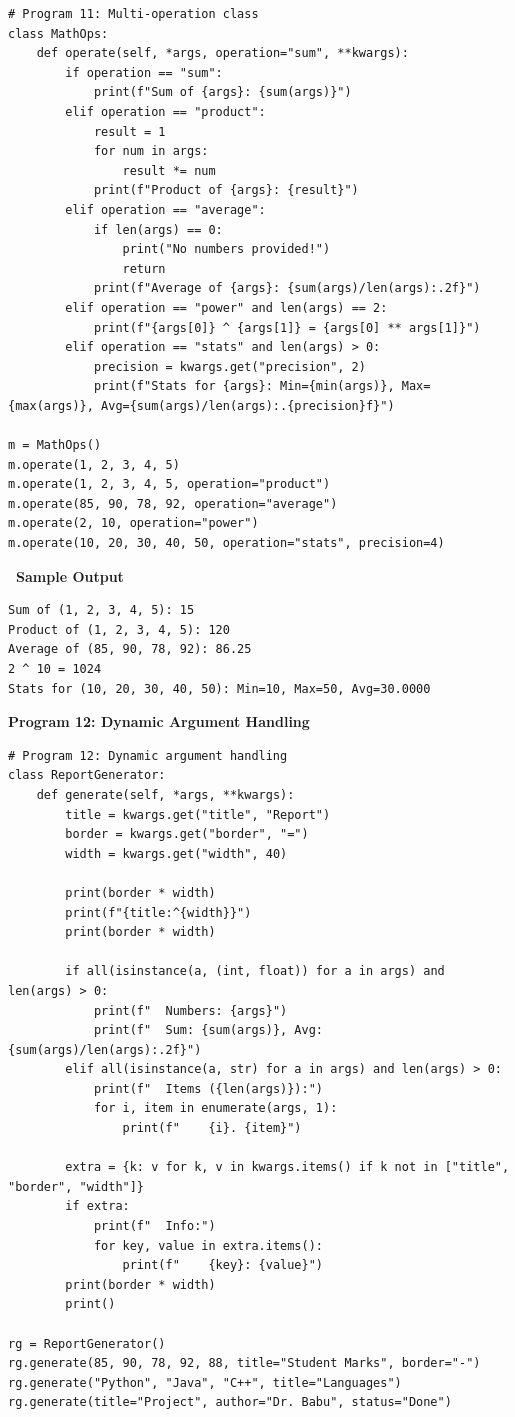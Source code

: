 \documentclass[12pt,a4paper]{article}
\newcommand{\outhead}{\noindent\colorbox{cmrgreen!25}%
  {\textbf{\small\color{cmrdark}~Sample Output~}}\par\vspace{-1pt}}
\begin{document}
\begin{lstlisting}
# Program 11: Multi-operation class
class MathOps:
    def operate(self, *args, operation="sum", **kwargs):
        if operation == "sum":
            print(f"Sum of {args}: {sum(args)}")
        elif operation == "product":
            result = 1
            for num in args:
                result *= num
            print(f"Product of {args}: {result}")
        elif operation == "average":
            if len(args) == 0:
                print("No numbers provided!")
                return
            print(f"Average of {args}: {sum(args)/len(args):.2f}")
        elif operation == "power" and len(args) == 2:
            print(f"{args[0]} ^ {args[1]} = {args[0] ** args[1]}")
        elif operation == "stats" and len(args) > 0:
            precision = kwargs.get("precision", 2)
            print(f"Stats for {args}: Min={min(args)}, Max={max(args)}, Avg={sum(args)/len(args):.{precision}f}")

m = MathOps()
m.operate(1, 2, 3, 4, 5)
m.operate(1, 2, 3, 4, 5, operation="product")
m.operate(85, 90, 78, 92, operation="average")
m.operate(2, 10, operation="power")
m.operate(10, 20, 30, 40, 50, operation="stats", precision=4)
\end{lstlisting}

\outhead
\begin{lstlisting}[style=outputstyle]
Sum of (1, 2, 3, 4, 5): 15
Product of (1, 2, 3, 4, 5): 120
Average of (85, 90, 78, 92): 86.25
2 ^ 10 = 1024
Stats for (10, 20, 30, 40, 50): Min=10, Max=50, Avg=30.0000
\end{lstlisting}

\vspace{0.5cm}

\textbf{Program 12: Dynamic Argument Handling}

\begin{lstlisting}
# Program 12: Dynamic argument handling
class ReportGenerator:
    def generate(self, *args, **kwargs):
        title = kwargs.get("title", "Report")
        border = kwargs.get("border", "=")
        width = kwargs.get("width", 40)

        print(border * width)
        print(f"{title:^{width}}")
        print(border * width)

        if all(isinstance(a, (int, float)) for a in args) and len(args) > 0:
            print(f"  Numbers: {args}")
            print(f"  Sum: {sum(args)}, Avg: {sum(args)/len(args):.2f}")
        elif all(isinstance(a, str) for a in args) and len(args) > 0:
            print(f"  Items ({len(args)}):")
            for i, item in enumerate(args, 1):
                print(f"    {i}. {item}")

        extra = {k: v for k, v in kwargs.items() if k not in ["title", "border", "width"]}
        if extra:
            print(f"  Info:")
            for key, value in extra.items():
                print(f"    {key}: {value}")
        print(border * width)
        print()

rg = ReportGenerator()
rg.generate(85, 90, 78, 92, 88, title="Student Marks", border="-")
rg.generate("Python", "Java", "C++", title="Languages")
rg.generate(title="Project", author="Dr. Babu", status="Done")
\end{lstlisting}
\end{document}
